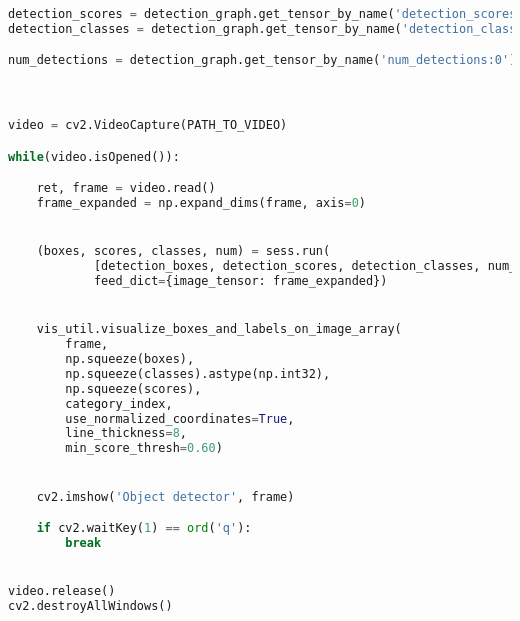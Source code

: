 \begin{appendices}
\begin{lstlisting}[language=Python, caption=Video Detection and Classification]
detection_scores = detection_graph.get_tensor_by_name('detection_scores:0')
detection_classes = detection_graph.get_tensor_by_name('detection_classes:0')

num_detections = detection_graph.get_tensor_by_name('num_detections:0')



video = cv2.VideoCapture(PATH_TO_VIDEO)

while(video.isOpened()):

	ret, frame = video.read()
	frame_expanded = np.expand_dims(frame, axis=0)


	(boxes, scores, classes, num) = sess.run(
			[detection_boxes, detection_scores, detection_classes, num_detections],
			feed_dict={image_tensor: frame_expanded})


	vis_util.visualize_boxes_and_labels_on_image_array(
		frame,
		np.squeeze(boxes),
		np.squeeze(classes).astype(np.int32),
		np.squeeze(scores),
		category_index,
		use_normalized_coordinates=True,
		line_thickness=8,
		min_score_thresh=0.60)


	cv2.imshow('Object detector', frame)

	if cv2.waitKey(1) == ord('q'):
		break


video.release()
cv2.destroyAllWindows()



\end{lstlisting}





\end{appendices}
